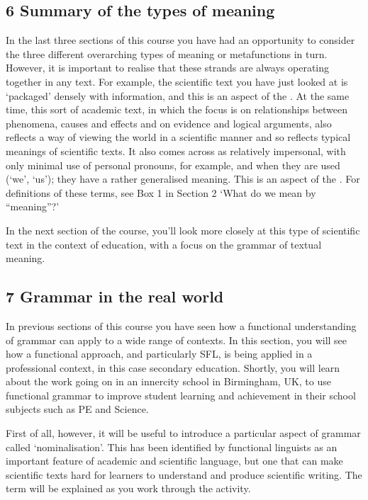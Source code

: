 \documentclass[letterpaper,10pt,english]{sphinxmanual}
\begin{document}
\subsection{6 Summary of the types of meaning}
\label{\detokenize{content/session_00/Part_00_06:6-Summary-of-the-types-of-meaning}}\label{\detokenize{content/session_00/Part_00_06::doc}}
In the last three sections of this course you have had an opportunity to consider the three different overarching types of meaning \textendash{} or metafunctions \textendash{} in turn. However, it is important to realise that these strands are always operating together in any text. For example, the scientific text you have just looked at is ‘packaged’ densely with information, and this is an aspect of the . At the same time, this sort of academic text, in which the focus is on relationships
between phenomena, causes and effects and on evidence and logical arguments, also reflects a way of viewing the world in a scientific manner and so reflects typical  meanings of scientific texts. It also comes across as relatively impersonal, with only minimal use of personal pronouns, for example, and when they are used (‘we’, ‘us’); they have a rather generalised meaning. This is an aspect of the . For definitions of these terms, see Box 1 in Section
2 ‘What do we mean by “meaning”?’

In the next section of the course, you’ll look more closely at this type of scientific text in the context of education, with a focus on the grammar of textual meaning.


\subsection{7 Grammar in the real world}
\label{\detokenize{content/session_00/Part_00_07:7-Grammar-in-the-real-world}}\label{\detokenize{content/session_00/Part_00_07::doc}}
In previous sections of this course you have seen how a functional understanding of grammar can apply to a wide range of contexts. In this section, you will see how a functional approach, and particularly SFL, is being applied in a professional context, in this case secondary education. Shortly, you will learn about the work going on in an inner\sphinxhyphen{}city school in Birmingham, UK, to use functional grammar to improve student learning and achievement in their school subjects such as PE and Science.

First of all, however, it will be useful to introduce a particular aspect of grammar called ‘nominalisation’. This has been identified by functional linguists as an important feature of academic and scientific language, but one that can make scientific texts hard for learners to understand and produce scientific writing. The term will be explained as you work through the activity.
\end{document}
